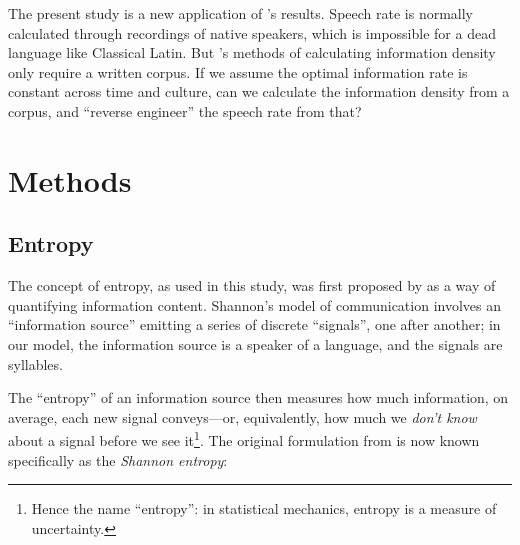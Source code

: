 \documentclass[12pt,twoside]{article}
\begin{document}
The present study is a new application of \citeauthor{coupé}'s results. Speech rate is normally calculated through recordings of native speakers, which is impossible for a dead language like Classical Latin. But \citeauthor{oh}'s methods of calculating information density only require a written corpus. If we assume the optimal information rate is constant across time and culture, can we calculate the information density from a corpus, and ``reverse engineer'' the speech rate from that?




\section{Methods}
\label{sec:meth}

\subsection{Entropy}
\label{subsec:entropy}

The concept of entropy, as used in this study, was first proposed by \citet{shannon} as a way of quantifying information content. Shannon's model of communication involves an ``information source'' emitting a series of discrete ``signals'', one after another; in our model, the information source is a speaker of a language, and the signals are syllables.

The ``entropy'' of an information source then measures how much information, on average, each new signal conveys---or, equivalently, how much we \emph{don't know} about a signal before we see it\footnote{Hence the name ``entropy'': in statistical mechanics, entropy is a measure of uncertainty.}. The original formulation from \citet[50]{shannon} is now known specifically as the \emph{Shannon entropy}:
\end{document}
